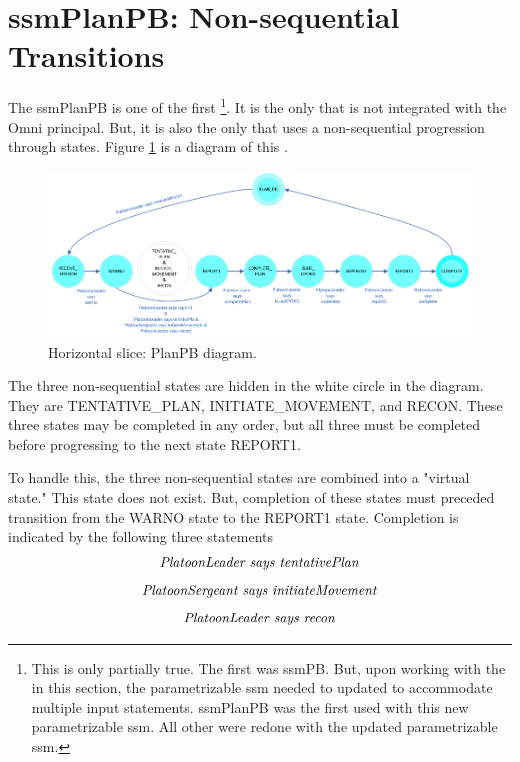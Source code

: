 \documentclass[../../main/main.tex]{subfiles}
\begin{document}
\section{ssmPlanPB: Non-sequential Transitions}
The ssmPlanPB  is one of the first \footnote{This is only partially true.  The first  was ssmPB.  But, upon working with the  in this section, the parametrizable ssm needed to updated to accommodate multiple input statements.  ssmPlanPB was the first  used with this new parametrizable ssm.  All other  were redone with the updated parametrizable ssm.}. It is the only  that is not integrated with the Omni principal.  But, it is also the only  that uses a non-sequential progression through states.  Figure \ref{ssmPlanPBDiagram2} is a diagram of this .

\begin{figure}[h!]
\centering
\includegraphics[width=\textwidth]{../figures/ssmPlanPBDiagram}
\caption{\label{ssmPlanPBDiagram2} Horizontal slice: PlanPB diagram.}
\end{figure}

The three non-sequential states are hidden in the white circle in the diagram.  They are TENTATIVE_PLAN, INITIATE_MOVEMENT, and RECON. These three states may be completed in any order, but all three must be completed before progressing to the next state REPORT1.  

To handle this, the three non-sequential states are combined into a "virtual state."  This state does not exist.  But, completion of these states must preceded transition from the WARNO state to the REPORT1 state.  Completion is indicated by the following three  statements
\[\text{\textit{PlatoonLeader says tentativePlan}}\]
\[\text{\textit{PlatoonSergeant says initiateMovement}}\]
\[\text{\textit{PlatoonLeader says recon}}\]
\end{document}

